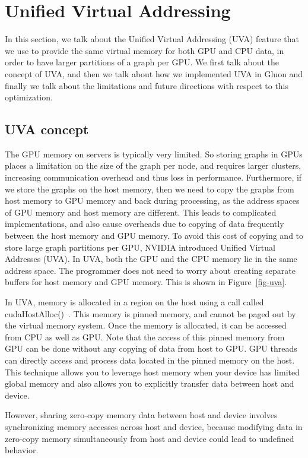 \section{Unified Virtual Addressing}
\label{sec-uva}

In this section, we talk about the Unified Virtual Addressing (UVA) feature that we use to provide the same virtual memory for both GPU and CPU data, in order to have larger partitions of a graph per GPU. We first talk about the concept of UVA, and then we talk about how we implemented UVA in Gluon and finally we talk about the limitations and future directions with respect to this optimization. 

\subsection{UVA concept}

The GPU memory on servers is typically very limited. So storing graphs in GPUs places a limitation on the size of the graph per node, and requires larger clusters, increasing communication overhead and thus loss in performance. Furthermore, if we store the graphs on the host memory, then we need to copy the graphs from host memory to GPU memory and back during processing, as the address spaces of GPU memory and host memory are different. This leads to complicated implementations, and also cause overheads due to copying of data frequently between the host memory and GPU memory. To avoid this cost of copying and to store large graph partitions per GPU, NVIDIA introduced Unified Virtual Addresses (UVA). In UVA, both the GPU and the CPU memory lie in the same address space. The programmer does not need to worry about creating separate buffers for host memory and GPU memory. This is shown in Figure~\ref{fig-uva}. 

In UVA, memory is allocated in a region on the host using a call called cudaHostAlloc()~\cite{alloc-cuda}. This memory is pinned memory, and cannot be paged out by the virtual memory system. Once the memory is allocated, it can be accessed from CPU as well as GPU. Note that the access of this pinned memory from GPU can be done without any copying of data from host to GPU. GPU threads can directly access and process data located in the pinned memory on the host. This technique allows you to leverage host memory when your device has limited global memory and also allows you to explicitly transfer data between host and device. 

However, sharing zero-copy memory data between host and device involves synchronizing memory accesses across host and device, because modifying data in zero-copy memory simultaneously from host and device could lead to undefined behavior. 

